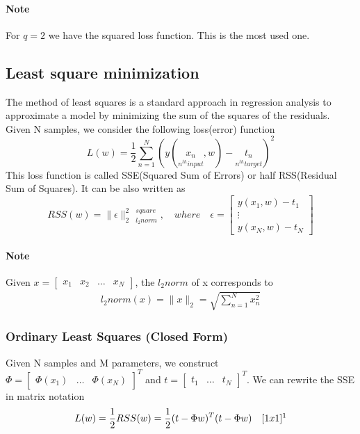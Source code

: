 \documentclass[main.tex]{subfiles}
\begin{document}
\paragraph{Note} For $q=2$ we have the squared loss function. This is the most used one.

\subsection{Least square minimization}
The method of least squares is a standard approach in regression analysis to approximate a model by minimizing the sum of the squares of the residuals. Given N samples, we consider the following loss(error) function
\begin{equation}
    L(w)=\frac{1}{2}\sum_{n=1}^N(y(\underset{n^{th}input}{x_n},w)-\underset{n^{th}target}{t_n})^2
\end{equation}
This loss function is called SSE(Squared Sum of Errors) or half RSS(Residual Sum of Squares). It can be also written as
\begin{equation}
    RSS(w)=\|\epsilon\|_{2\quad l_2norm}^{2\quad square},\quad where \quad \epsilon=\begin{bmatrix}y(x_1,w)-t_1\\ \vdots \\ y(x_N,w)-t_N\end{bmatrix}
\end{equation}
\paragraph{Note} Given $x=\begin{bmatrix}x_1 & x_2 & \dots & x_{N}\end{bmatrix}$, the $l_2 norm$ of x corresponds to
\begin{align}
    l_2norm(x) = \|x\|_{2} = \sqrt{\sum_{n=1}^{N} x_n^2}
\end{align}

\newpage
\subsubsection{Ordinary Least Squares (Closed Form)}
Given N samples and M parameters, we construct $\Phi=\begin{bmatrix}\Phi(x_1) & \dots & \Phi(x_N)\end{bmatrix}^T$ and $t=\begin{bmatrix}t_1 & \dots & t_N\end{bmatrix}^T$.
\newline
We can rewrite the SSE in matrix notation
\begin{equation}
    L(w) = \frac{1}{2}RSS(w)=\frac{1}{2}(t-\Phi w)^T(t-\Phi w) \quad [1x1]\footnotemark
\end{equation}
\end{document}
